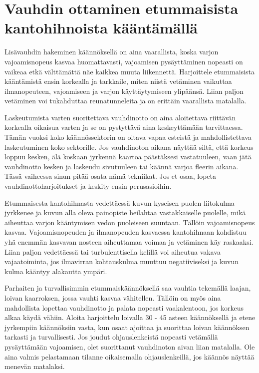 \section{ Vauhdin ottaminen etummaisista kantohihnoista kääntämällä }
\label{laskeutumistekniikat-vauhdin-ottaminen-etummaisista-kantohihnoista-kaantamalla}


Lisävauhdin hakeminen käännöksellä on aina vaarallista, koska varjon vajoamisnopeus kasvaa huomattavasti, vajoamisen pysäyttäminen nopeasti on vaikeaa etkä välttämättä näe kaikkea muuta liikennettä. Harjoittele etummaisista kääntämistä ensin korkealla ja tarkkaile, miten niistä vetäminen vaikuttaa ilmanopeuteen, vajoamiseen ja varjon käyttäytymiseen ylipäänsä. Liian paljon vetäminen voi tukahduttaa reunatunneleita ja on erittäin vaarallista matalalla.  


Laskeutumista varten suoritettava vauhdinotto on aina aloitettava riittävän korkealla oikaisua varten ja se on pystyttävä aina keskeyttämään tarvittaessa. Tämän vuoksi koko käännössektorin on oltava vapaa esteistä ja mahdollistettava laskeutuminen koko sektorille. Jos vauhdinoton aikana näyttää siltä, että korkeus loppuu kesken, älä koskaan jyrkennä kaartoa päästäksesi vastatuuleen, vaan jätä vauhdinotto kesken ja laskeudu sivutuuleen tai käännä varjoa fleerin aikana. Tässä vaiheessa sinun pitää osata nämä tekniikat. Jos et osaa, lopeta vauhdinottoharjoitukset ja keskity ensin perusasioihin. 


Etummaisesta kantohihnasta vedettäessä kuvun kyseisen puolen liitokulma jyrkkenee ja kuvun alla oleva painopiste heilahtaa vastakkaiselle puolelle, mikä aiheuttaa varjon kääntymisen vedon puoleiseen suuntaan. Tällöin vajoamisnopeus kasvaa. Vajoamisnopeuden ja ilmanopeuden kasvaessa kantohihnaan kohdistuu yhä enemmän kasvavan nosteen aiheuttamaa voimaa ja vetäminen käy raskaaksi. Liian paljon vedettäessä tai turbulenttisella kelillä voi aiheutua vakava vajaatoiminta, jos ilmavirran kohtauskulma muuttuu negatiiviseksi ja kuvun kulma kääntyy alakautta ympäri. 


Parhaiten ja turvallisimmin etummaiskäännöksellä saa vauhtia tekemällä laajan, loivan kaarroksen, jossa vauhti kasvaa vähitellen. Tällöin on myös aina mahdollista lopettaa vauhdinotto ja palata nopeasti vaakalentoon, jos korkeus alkaa käydä vähiin. Aloita harjoittelu loivalla 30 - 45 asteen käännöksellä ja etene jyrkempiin käännöksiin vasta, kun osaat ajoittaa ja suorittaa loivan käännöksen tarkasti ja turvallisesti. Jos joudut ohjauslenkeistä nopeasti vetämällä pysäyttämään vajoamisen, olet suorittanut vauhdinoton aivan liian matalalla. Ole aina valmis pelastamaan tilanne oikaisemalla ohjauslenkeillä, jos käännös näyttää menevän matalaksi. 


